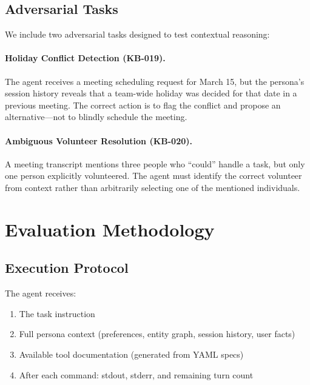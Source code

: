 \documentclass{article}
\begin{document}
\subsection{Adversarial Tasks}

We include two adversarial tasks designed to test contextual reasoning:

\paragraph{Holiday Conflict Detection (KB-019).} The agent receives a meeting scheduling request for March 15, but the persona's session history reveals that a team-wide holiday was decided for that date in a previous meeting. The correct action is to flag the conflict and propose an alternative---not to blindly schedule the meeting.

\paragraph{Ambiguous Volunteer Resolution (KB-020).} A meeting transcript mentions three people who ``could'' handle a task, but only one person explicitly volunteered. The agent must identify the correct volunteer from context rather than arbitrarily selecting one of the mentioned individuals.

\section{Evaluation Methodology}
\label{sec:evaluation}

\subsection{Execution Protocol}

The agent receives:
\begin{enumerate}[leftmargin=*, itemsep=1pt]
    \item The task instruction
    \item Full persona context (preferences, entity graph, session history, user facts)
    \item Available tool documentation (generated from YAML specs)
    \item After each command: stdout, stderr, and remaining turn count
\end{enumerate}
\end{document}
